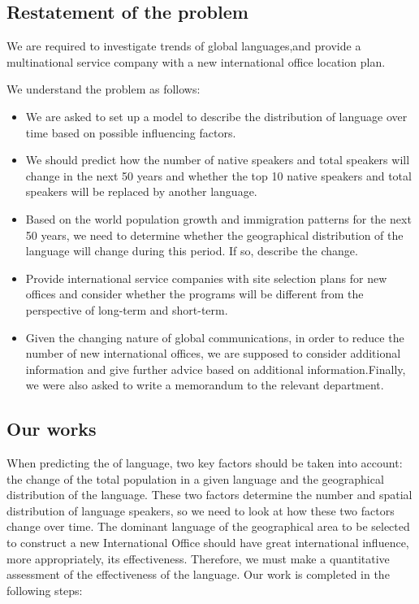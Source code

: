 \subsection{Restatement of the problem}
\noindent
We are required to investigate trends of global languages,and provide a multinational service company with a new international office location plan.
\par We understand the problem as follows:

	\begin{itemize}
		\item
We are asked to set up a model to describe the distribution of language over time based on possible influencing factors.
		\item
We should predict how the number of native speakers and total speakers will change in the next 50 years and whether the top 10 native speakers and total speakers will be replaced by another language.
		 \item
Based on the world population growth and immigration patterns for the next 50 years, we need to determine whether the geographical distribution of the language will change during this period. If so, describe the change.
		 \item 
Provide international service companies with site selection plans for new offices and consider whether the programs will be different from the perspective of long-term and short-term.
		\item 
Given the changing nature of global communications, in order to reduce the number of new international offices, we are supposed to consider additional information and give further advice based on additional information.Finally, we were also asked to write a memorandum to the relevant department. 		 	 
	\end{itemize}



\subsection{Our works}
When predicting the of language, two key factors should be taken into account: the change of the total population in a given language and the geographical distribution of the language. These two factors determine the number and spatial distribution of language speakers, so we need to look at how these two factors change over time. The dominant language of the geographical area to be selected to construct a new International Office should have great international influence, more appropriately, its effectiveness. Therefore, we must make a quantitative assessment of the effectiveness of the language. Our work is completed in the following steps:

